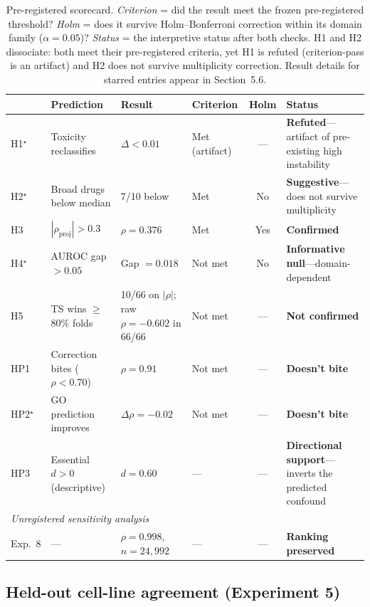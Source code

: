 \documentclass[11pt]{article}
\begin{document}
\begin{table}[t]
\centering
\caption{Pre-registered scorecard.
\emph{Criterion} = did the result meet the frozen pre-registered
threshold?
\emph{Holm} = does it survive Holm--Bonferroni correction within its
domain family ($\alpha = 0.05$)?
\emph{Status} = the interpretive status after both checks.
H1 and H2 dissociate: both meet their pre-registered criteria, yet H1
is refuted (criterion-pass is an artifact) and H2 does not survive
multiplicity correction.
Result details for starred entries appear in Section~5.6.}
\label{tab:scorecard}
\small
\begin{tabular}{@{}lp{2.7cm}p{3.0cm}p{1.7cm}cp{3.3cm}@{}}
\toprule
 & Prediction & Result & Criterion & Holm & Status \\
\midrule
H1$^\star$ & Toxicity reclassifies & $\Delta < 0.01$ & Met (artifact) & --- & \textbf{Refuted}---artifact of pre-existing high instability \\
H2$^\star$ & Broad drugs below median & 7/10 below & Met & No & \textbf{Suggestive}---does not survive multiplicity \\
H3 & $|\rho_{\text{proj}}| > 0.3$ & $\rho = 0.376$ & Met & Yes & \textbf{Confirmed} \\
H4$^\star$ & AUROC gap $> 0.05$ & Gap $= 0.018$ & Not met & No & \textbf{Informative null}---domain-dependent \\
H5 & TS wins $\geq$80\% folds & 10/66 on $|\rho|$; raw $\rho=-0.602$ in 66/66 & Not met & --- & \textbf{Not confirmed} \\
\midrule
HP1 & Correction bites ($\rho < 0.70$) & $\rho = 0.91$ & Not met & --- & \textbf{Doesn't bite} \\
HP2$^\star$ & GO prediction improves & $\Delta\rho = -0.02$ & Not met & --- & \textbf{Doesn't bite} \\
HP3 & Essential $d > 0$ (descriptive) & $d = 0.60$ & --- & --- & \textbf{Directional support}---inverts the predicted confound \\
\midrule
\multicolumn{6}{l}{\emph{Unregistered sensitivity analysis}}\\
Exp.~8 & --- & $\rho = 0.998$, $n = 24{,}992$ & --- & --- & \textbf{Ranking preserved} \\
\bottomrule
\end{tabular}
\end{table}

\subsection{Held-out cell-line agreement (Experiment 5)}
\label{sec:exp5}
\end{document}
